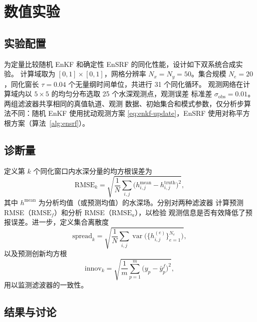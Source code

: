 \documentclass[12pt,a4paper]{article}
\begin{document}
\section{数值实验}
\label{sec:experiments}

\subsection{实验配置}

为定量比较随机 EnKF 和确定性 EnSRF 的同化性能，设计如下双系统合成实验。
计算域取为 $[0, 1] \times [0, 1]$，网格分辨率 $N_x = N_y = 50$。集合规模
$N_e = 20$，同化窗长 $\tau = 0.04$ 个无量纲时间单位，共进行 31 个同化循环。
观测网络在计算域内以 $5 \times 5$ 的均匀分布选取 25 个水深观测点，观测误差
标准差 $\sigma_{\mathrm{obs}} = 0.01$。两组滤波器共享相同的真值轨道、观测
数据、初始集合和模式参数，仅分析步算法不同：随机 EnKF 使用扰动观测方案
\eqref{eq:enkf-update}，EnSRF 使用对称平方根方案（算法~\ref{alg:ensrf}）。

\subsection{诊断量}

定义第 $k$ 个同化窗口内水深分量的均方根误差为
\begin{equation}
  \mathrm{RMSE}_k = \sqrt{
    \frac{1}{N}\sum_{i,j}
    \bigl(h_{i,j}^{\mathrm{mean}} - h_{i,j}^{\mathrm{truth}}\bigr)^2
  },
  \label{eq:rmse}
\end{equation}
其中 $h^{\mathrm{mean}}$ 为分析均值（或预测均值）的水深场。分别对两种滤波器
计算预测 RMSE（$\mathrm{RMSE}_f$）和分析 RMSE（$\mathrm{RMSE}_a$），以检验
观测信息是否有效降低了预报误差。进一步，定义集合离散度
\[
  \mathrm{spread}_k = \sqrt{
    \frac{1}{N}\sum_{i,j} \operatorname{var}\bigl(\{h_{i,j}^{(e)}\}_{e=1}^{N_e}\bigr)
  },
\]
以及预测创新均方根
\[
  \mathrm{innov}_k = \sqrt{
    \frac{1}{m}\sum_{p=1}^{m}
    \bigl(y_p - \bar{y}_p^f\bigr)^2
  },
\]
用以监测滤波器的一致性。

\subsection{结果与讨论}
\end{document}
